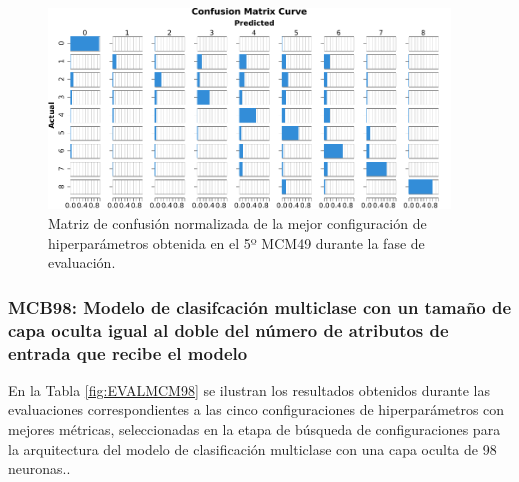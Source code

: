 \begin{figure}[H]
    \centering
    \includegraphics[width=0.95\textwidth]{./img/evaluacion/matrices_confusion/MCNorm_EVAL_MCM49.pdf}
    \caption{Matriz de confusión normalizada de la mejor configuración de hiperparámetros obtenida en el 5º MCM49 durante la fase de evaluación.}
    \label{fig:MCNorm_EVAL_MCM49}
\end{figure}




\subsubsection{MCB98: Modelo de clasifcación multiclase con un tamaño de capa oculta igual al doble del número de atributos de entrada que recibe el modelo}
En la Tabla \ref{fig:EVALMCM98} se ilustran los resultados obtenidos durante las evaluaciones correspondientes a las cinco configuraciones de hiperparámetros con mejores métricas, seleccionadas en la etapa de búsqueda de configuraciones para la arquitectura del modelo de clasificación multiclase con una capa oculta de 98 neuronas..

